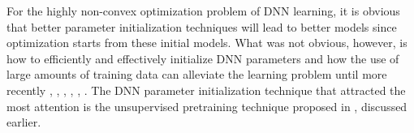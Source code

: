 	 For the highly non-convex optimization problem of DNN learning,
it is obvious that better parameter initialization techniques will
lead to better models since optimization starts from these initial models.
What was not obvious, however, is how to efficiently and effectively
initialize DNN parameters and how the use of large amounts of
training data can alleviate the learning problem until more recently
\cite{Bengio07greedylayer-wise}, \cite{Bengio:2009:LDA:1658423.1658424}, \cite{DBLP:conf/interspeech/DengSYAMH10}, \cite{Dahl12context-dependentpre-trained}, \cite{Hinton06afast}, \cite{HintonSalakhutdinov2006b}. The DNN parameter
initialization technique that attracted the most attention is the unsupervised
pretraining technique proposed in \cite{Hinton06afast}, \cite{HintonSalakhutdinov2006b} discussed earlier.

